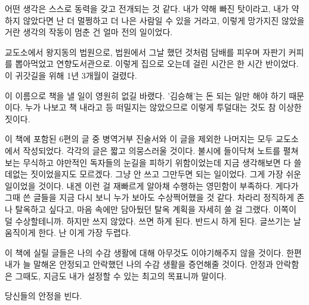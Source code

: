\documentclass[12pt, b6paper, openany]{memoir}
\newenvironment{article}{}{}
\begin{document}
\begin{article}
어떤 생각은 스스로 동력을 갖고 전개되는 것 같다. 내가 약해 빠진 탓이라고, 내가 약하지 않았다면 난 더 멀쩡하고 더 나은 사람일 수 있을 거라고, 이렇게 망가지진 않았을 거란 생각의 작동이 멈춘 건 얼마 전의 일이었다.

교도소에서 왕지동의 법원으로, 법원에서 그날 했던 것처럼 담배를 피우며 자판기 커피를 뽑아먹었고 연향도서관으로. 이렇게 집으로 오는데 걸린 시간은 한 시간 반이었다. 이 귀갓길을 위해 1년 3개월이 걸렸다.

이 이름으로 책을 낼 일이 영원히 없길 바랬다. '김승해'는 돈 되는 일만 해야 하기 때문이다. 누가 나보고 책 내라고 등 떠밀지는 않았으므로 이렇게 투덜대는 것도 참 이상한 짓이다.

이 책에 포함된 6편의 글 중 병역거부 진술서와 이 글을 제외한 나머지는 모두 교도소에서 작성되었다. 각각의 글은 짧고 의뭉스러울 것이다. 불시에 들이닥쳐 노트를 펼쳐보는 무식하고 야만적인 독자들의 눈길을 피하기 위함이었는데 지금 생각해보면 다 쓸데없는 짓이었을지도 모르겠다. 그냥 안 쓰고 그만두면 되는 일이었다. 그게 가장 쉬운 일이었을 것이다. 내겐 이런 걸 재빠르게 알아채 수행하는 영민함이 부족하다. 게다가 그때 쓴 글들을 지금 다시 보니 누가 보아도 수상쩍어했을 것 같다. 차라리 정직하게 존나 탈옥하고 싶다고, 마음 속에만 담아뒀던 탈옥 계획을 자세히 쓸 걸 그랬다. 이쪽이 덜 수상할테니까. 하지만 쓰지 않았다. 쓰면 하게 된다. 반드시 하게 된다. 글쓰기는 날 움직이게 한다. 난 이게 가장 두렵다.

이 책에 실릴 글들은 나의 수감 생활에 대해 아무것도 이야기해주지 않을 것이다. 한편 내가 늘 말해온 안정되고 안락했던 나의 수감 생활을 증언해줄 것이다. 안정과 안락함은 그때도, 지금도 내가 설정할 수 있는 최고의 목표니까 말이다.

당신들의 안정을 빈다.
\end{article}

\backmatter
\end{document}
